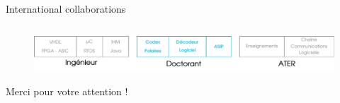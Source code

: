 \documentclass[t,compress,mathserif,12pt,xcolor=dvipsnames]{beamer}
\begin{document}
\begin{frame}[t]{International collaborations}
\begin{minipage}[t][5.0cm][t]{\textwidth}
\begin{columns}[T]
\begin{column}{0.33\textwidth}

      \end{column}
    \end{columns}
  \end{minipage}
  \begin{figure}[htp]
    \centering
    \includegraphics[width=\textwidth]{fig/frise23}
  \end{figure}
\end{frame}


\begin{frame}[c]{}
\vfill
\centering
Merci pour votre attention !
\vfill
\end{frame}
\end{document}
